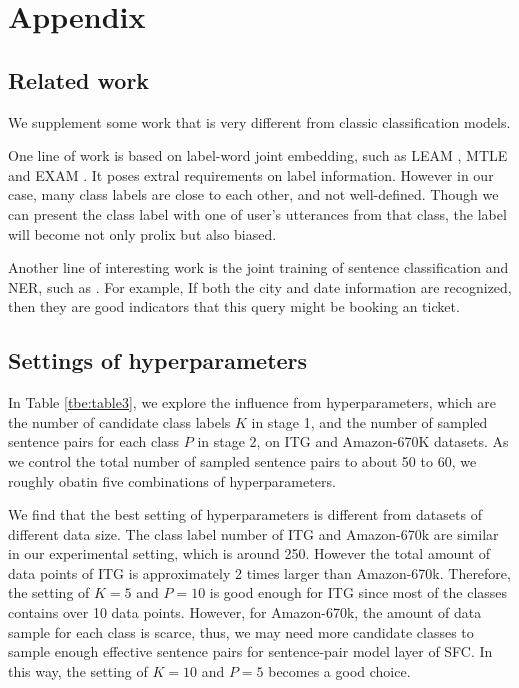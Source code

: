 \appendix

\newpage
\section{Appendix}

\subsection{Related work}
We supplement some work that is very different from classic classification models.

One  line  of  work  is  based  on  label-word  joint  embedding,  such  as LEAM
\cite{wang2018joint}, MTLE \cite{zhang2017multi} and EXAM \cite{du2019explicit}.
It  poses  extral  requirements  on label information. However in our case, many
class  labels  are  close  to  each  other,  and not well-defined. Though we can
present the class label with one of user's utterances from that class, the label
will  become  not  only prolix but also biased.

Another   line   of   interesting   work  is  the  joint  training  of  sentence
classification     and     NER,     such    as    
\cite{kruengkrai2020improving,zhang2020graph,hakkani2016multi,liu2016attention,goo2018slot}.  
For  example,  If  both  the  city and date information are
recognized,  then  they  are good indicators that this query might be booking an
ticket. 

\subsection{Settings  of  hyperparameters} 
In  Table \ref{tbe:table3}, we explore the influence from hyperparameters, which
are  the  number  of  candidate  class  labels $K$ in stage 1, and the number of
sampled  sentence  pairs  for  each class $P$ in stage 2, on ITG and Amazon-670K
datasets.  As we control the total number of sampled sentence pairs to about 50 to 60, we
roughly obatin five combinations of hyperparameters.  

We find  that the best setting of hyperparameters is different from datasets
of  different  data  size.  The  class label number of ITG and Amazon-670k are
similar  in  our  experimental setting, which is around 250. However the total
amount of data points of ITG is approximately 2 times larger than Amazon-670k.
Therefore,  the  setting of $K=5$ and $P=10$ is good enough for ITG since most
of  the  classes  contains  over 10 data points. However, for Amazon-670k, the
amount  of  data  sample  for  each  class  is  scarce, thus, we may need more
candidate  classes to sample enough effective sentence pairs for sentence-pair
model  layer  of  SFC.  In this way, the setting of $K=10$ and $P=5$ becomes a
good choice. 

